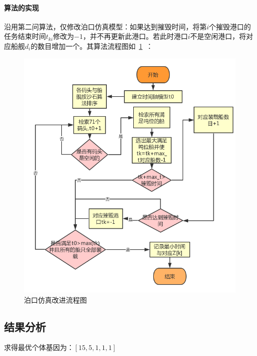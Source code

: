 \documentclass{whutmod}
\begin{document}
     \paragraph{算法的实现}
     	沿用第二问算法，仅修改泊口仿真模型：如果达到摧毁时间，将第$i$个摧毁港口的任务结束时间$t_{ki}$修改为$-1$，并不再更新此港口。若此时港口$i$不是空闲港口，将对应船舰$d_{i}$的数目增加一个。其算法流程图如~\ref{dieyyrywen}~：
    \begin{figure}[H]
	\centering
	\includegraphics[width=\textwidth]{figures/yyyy.png}
	\caption{泊口仿真改进流程图}\label{dieyyrywen}
\end{figure}

	\subsection{结果分析}
     	求得最优个体基因为：$[15,5,1,1,1]$
     
\end{document}
